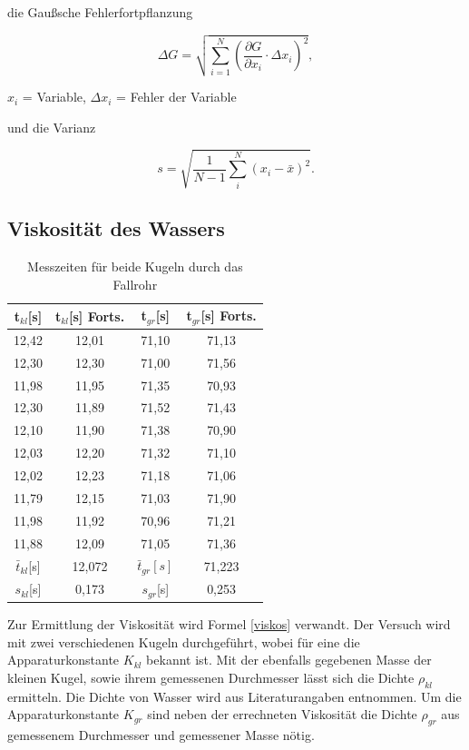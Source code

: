 die Gaußsche Fehlerfortpflanzung

\begin{formel}
\begin{equation}
\Delta G = \sqrt{\sum_{i=1}^{N}\left( \frac{\partial G}{\partial x_i}\cdot \Delta x_i\right)^2},
\label{gauss}
\end{equation}
\caption*{$x_i$ = Variable, $\Delta x_i$ = Fehler der Variable}
\end{formel}

und die Varianz

\begin{equation}
 s = \sqrt{\frac{1}{N-1} \sum_{i}^{N} (x_i - \bar{x})^2}.
\end{equation}

\subsection{Viskosität des Wassers}

\renewcommand{\arraystretch}{1.2}
\begin{table}[h]
 \begin{tabular}{c|c||c|c}
 t$_{kl}$[s] & t$_{kl}$[s] Forts. & t$_{gr}$[s] & t$_{gr}$[s] Forts.\\
 \hline
12,42&	12,01&	71,10&	71,13\\
12,30&	12,30&	71,00&	71,56\\
11,98&	11,95&	71,35&	70,93\\
12,30&	11,89&	71,52&	71,43\\
12,10&	11,90&	71,38&	70,90\\
12,03&	12,20&	71,32&	71,10\\
12,02&	12,23&	71,18&	71,06\\
11,79&	12,15&	71,03&	71,90\\
11,98&	11,92&	70,96&	71,21\\
11,88&	12,09&	71,05&	71,36\\
\hline
$\bar t_{kl}$[s] &12,072 &$\bar t_{gr}[s] $&71,223\\
$s_{kl}$[s] & 0,173 & $s_{gr}$[s] & 0,253
 \end{tabular}
\caption{Messzeiten für beide Kugeln durch das Fallrohr}
\end{table}
\renewcommand{\arraystretch}{1}

Zur Ermittlung der Viskosität wird Formel \eqref{viskos} verwandt. Der Versuch wird mit zwei verschiedenen Kugeln durchgeführt, wobei
für eine die Apparaturkonstante $K_{kl}$ bekannt ist. Mit der ebenfalls gegebenen Masse der kleinen Kugel, sowie ihrem gemessenen Durchmesser
lässt sich die Dichte $\rho_{kl}$ ermitteln. Die Dichte von Wasser wird aus Literaturangaben entnommen. Um die Apparaturkonstante 
$K_{gr}$ sind neben der errechneten Viskosität die Dichte $\rho_{gr}$ aus gemessenem Durchmesser und gemessener Masse nötig.

